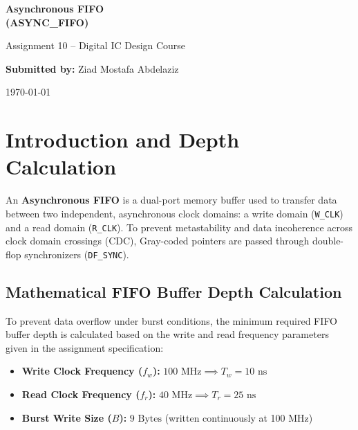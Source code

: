 \documentclass[12pt,a4paper]{article}
\begin{document}
\begin{titlepage}
\centering
\vspace*{2cm}
{\Huge\bfseries Asynchronous FIFO\\(ASYNC\_FIFO)\par}
\vspace{1cm}
{\Large Assignment 10 -- Digital IC Design Course\par}
\vspace{2cm}
{\large\textbf{Submitted by:} Ziad Mostafa Abdelaziz\par}
\vspace{0.5cm}
{\large\today\par}
\vfill
\end{titlepage}

\tableofcontents
\newpage

\section{Introduction and Depth Calculation}

An \textbf{Asynchronous FIFO} is a dual-port memory buffer used to transfer data between two independent, asynchronous clock domains: a write domain (\texttt{W\_CLK}) and a read domain (\texttt{R\_CLK}). To prevent metastability and data incoherence across clock domain crossings (CDC), Gray-coded pointers are passed through double-flop synchronizers (\texttt{DF\_SYNC}).

\subsection{Mathematical FIFO Buffer Depth Calculation}

To prevent data overflow under burst conditions, the minimum required FIFO buffer depth is calculated based on the write and read frequency parameters given in the assignment specification:

\begin{itemize}
    \item \textbf{Write Clock Frequency ($f_w$):} $100\text{ MHz} \implies T_w = 10\text{ ns}$
    \item \textbf{Read Clock Frequency ($f_r$):} $40\text{ MHz} \implies T_r = 25\text{ ns}$
    \item \textbf{Burst Write Size ($B$):} $9\text{ Bytes}$ (written continuously at 100 MHz)
\end{itemize}
\end{document}
